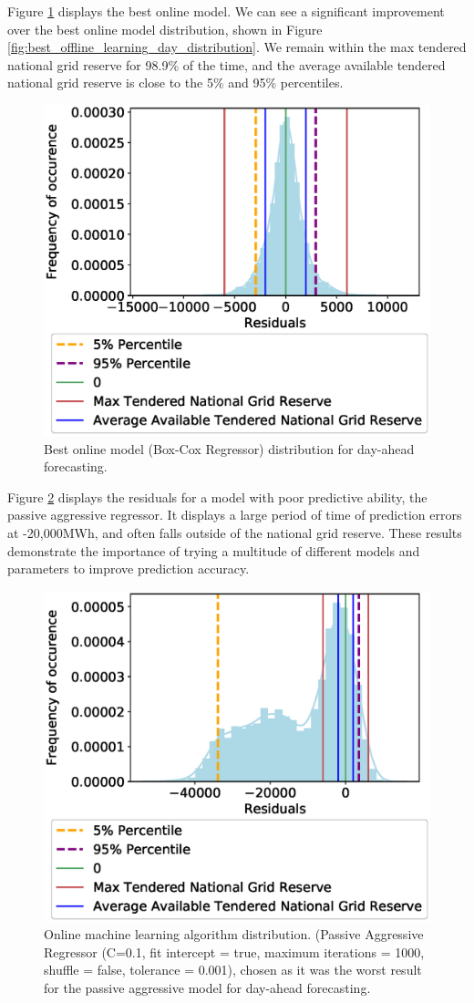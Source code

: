 Figure \ref{fig:best_online_learning_day_distribution} displays the best online model. We can see a significant improvement over the best online model distribution, shown in Figure \ref{fig:best_offline_learning_day_distribution}. We remain within the max tendered national grid reserve for 98.9\% of the time, and the average available tendered national grid reserve is close to the 5\% and 95\% percentiles.



\begin{figure}
	\centering
	\includegraphics[width=0.6\columnwidth]{Chapter5/figures/market-forecasting/results/online_learning_dists-power-0.1.eps}
	\caption{Best online model (Box-Cox Regressor) distribution for day-ahead forecasting.}
	\label{fig:best_online_learning_day_distribution}
\end{figure}

Figure \ref{fig:bad_online_learning_day_distribution} displays the residuals for a model with poor predictive ability, the passive aggressive regressor. It displays a large period of time of prediction errors at -20,000MWh, and often falls outside of the national grid reserve. These results demonstrate the importance of trying a multitude of different models and parameters to improve prediction accuracy.

\begin{figure}
	\centering
	\includegraphics[width=0.6\columnwidth]{Chapter5/figures/market-forecasting/results/online_learning_dists-C-0.1-fit_intercept-true-max_iter-1000-shuffle-false-tol-001.eps}
	\caption{Online machine learning algorithm distribution. (Passive Aggressive Regressor (C=0.1, fit intercept = true, maximum iterations = 1000, shuffle = false, tolerance = 0.001), chosen as it was the worst result for the passive aggressive model for day-ahead forecasting.}
	\label{fig:bad_online_learning_day_distribution}
\end{figure}



